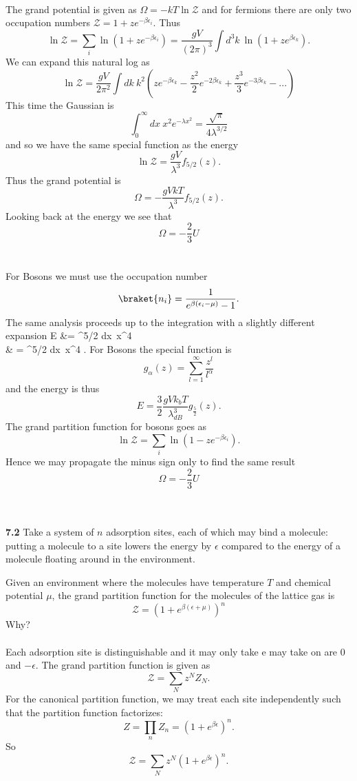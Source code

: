 \documentclass[11pt,letterpaper]{article}
\begin{document}
	\\
	The grand potential is given as $\Omega = -kT\ln \mathcal Z$ and for fermions there are only
	two occupation numbers 
	$\mathcal Z = 1+ze^{-\beta\epsilon_i}$. Thus
	\[
		\ln\mathcal Z = \sum_i \ln(1+ze^{-\beta\epsilon_i}) = \frac{gV}{(2\pi)^3}\int d^3k\ 
		\ln(1+ze^{\beta\epsilon_k}).
	\]
	We can expand this natural log as
	\[
		\ln\mathcal Z = \frac{gV}{2\pi^2}\int dk\  k^2(ze^{-
		\beta\epsilon_k}-\frac{z^2}{2}e^{-2\beta\epsilon_k}+\frac{z^3}{3}e^{-3\beta\epsilon_k}-...)
	\]
	This time the Gaussian is
	\[
		\int_0^\infty dx\ x^2e^{-\lambda x^2} = \frac{\sqrt\pi}{4\lambda^{3/2}}
	\]
	and so we have the same special function as the energy
	\[
		\ln\mathcal Z = \frac{gV}{\lambda^3}f_{5/2}(z).
	\]
	Thus the grand potential is
	\[
		\Omega = -\frac{gVkT}{\lambda^3}f_{5/2}(z).
	\]
	Looking back at the energy we see that 
	\[
		\Omega = -\frac{2}{3} U
	\]
	\\
	\\
	For Bosons we must use the occupation number
	\[
		\braket{n_i} = \frac{1}{e^{\beta(\epsilon_i-\mu)}-1}.
	\]
	The same analysis proceeds up to the integration with a slightly different expansion
	\ba
		E &= 
		^{5/2} \int dx\ x^4  \\
		 & = \frac{gV}{(2\pi)^2}\frac{\h^2}{2m}
		^{5/2} \int dx\ x^4 .
	\ea
	For Bosons the special function is
	\[
		g_\alpha(z) = \sum_{l=1}^\infty \frac{z^l}{l^\alpha}
	\]
	and the energy is thus
	\[
		E = \frac{3}{2}\frac{gVk_bT}{\lambda_{dB}^3}g_{\frac{5}{2}}(z).
	\]
	The grand partition function for bosons goes as
	\[
		\ln\mathcal Z = \sum_i \ln(1-ze^{-\beta\epsilon_i}) .
	\]
	Hence we may propagate the minus sign only to find the same result
	\[
		\Omega = -\frac{2}{3} U
	\]
	\\
	\\
	\item[\textbf{7.2}]
	Take a system of $n$ adsorption sites, each of which may bind a molecule: putting a molecule to a site lowers the 
	energy by $\epsilon$ compared to the energy of a molecule floating around in the environment. 
	\\
	\benum
	\item
	Given an environment where the molecules have temperature $T$ and chemical potential $\mu$, the 
	grand partition
	function for the molecules of the lattice gas is
	\[
		\mathcal Z = (1+e^{\beta(\epsilon+\mu)})^n
	\]
	Why?
	\\
	\\
	Each adsorption site is distinguishable and it may only take e may take on are $0$ and $-\epsilon$.
	The grand partition function is given as
	\[
		\mathcal Z= \sum_N z^NZ_N.
	\]
	For the canonical partition function, we may treat each site independently such that the
	partition function factorizes:
	\[	
		Z = \prod_n Z_n = (1+e^{\beta \epsilon})^n.
	\]
	So
	\[
		\mathcal Z = \sum_N z^N(1+e^{\beta\epsilon})^n.
	\]
    	
\end{document}
